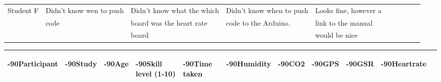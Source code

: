 \documentclass[conference]{IEEEtran}
\begin{document}
\begin{figure*}[ht]
\begin{enumerate}
\begin{enumerate}
\begin{figure*}[!ht]
\begin{tabular}{ | l | l | l | l | l | l | l | l | l | l | }
			Student F		& Didn't know wen to push	& Didn't know what the which	& Didn't know when to push	& Looks fine, however a	\\ 
							& code						& board was the heart rate 		& code to the Arduino.		& link to the manual	\\
							&  							& board							& 							& would be nice			\\ \hline
			\end{tabular}
			\caption{General distribution of participants}
			\begin{tabular}{ | l | l | l | l | l | l | l | l | l | l | l }
				\hline
					\begin{turn}{-90}Participant\end{turn}			&
					\begin{turn}{-90}Study\end{turn}				&
					\begin{turn}{-90}Age\end{turn}					&
					\begin{turn}{-90}Skill level (1-10)\end{turn}	&
					\begin{turn}{-90}Time taken\end{turn}			&
					\begin{turn}{-90}Humidity\end{turn}			&
					\begin{turn}{-90}CO2\end{turn}					&
					\begin{turn}{-90}GPS\end{turn}					&
					\begin{turn}{-90}GSR\end{turn}					&
					\begin{turn}{-90}Heartrate\end{turn}			
					\\ \hline \hline
			

\end{tabular}
\end{figure*}
\end{enumerate}
\end{enumerate}
\end{figure*}
\end{document}
